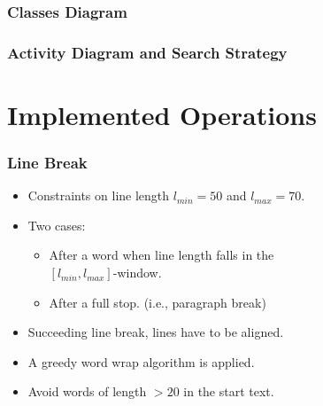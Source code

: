\documentclass{beamer}
\begin{document}
\begin{frame}
\frametitle{Classes Diagram}
\end{frame}

\begin{frame}
\frametitle{Activity Diagram and Search Strategy}
\end{frame}

\section{Implemented Operations}

\begin{frame}
\frametitle{Line Break}


\begin{itemize}
\item Constraints on line length $l_{min}=50$ and $l_{max}=70.$



\item Two cases: 



\begin{itemize}
\item After a word when line length falls in the\\
 $[l_{min},l_{max}]$-window.
\item After a full stop. (i.e., paragraph break)
\end{itemize}


\item Succeeding line break, lines have to be aligned.

\item A greedy word wrap algorithm is applied. 

\item Avoid words of length $>20$ in the start text.
\end{itemize}




\end{frame}
\end{document}
